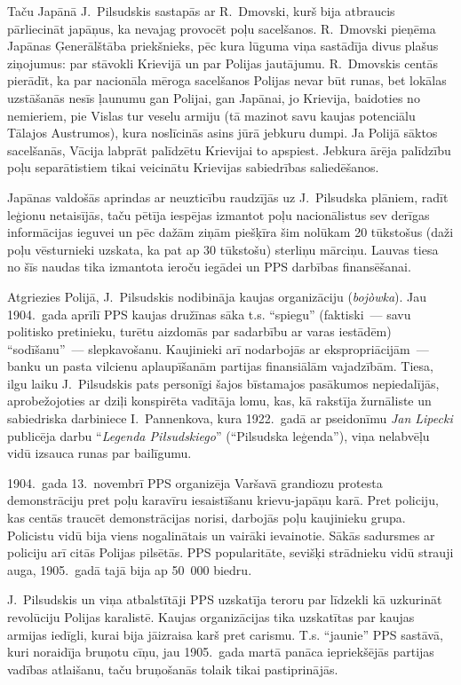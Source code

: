 \documentclass[twoside,a5paper,12pt,fleqn,openany]{extbook}
\newcommand{\pltxti}[1]{\textit{\textpolish{#1}}}
\begin{document}
Taču Japānā J.~Pilsudskis sastapās ar R.~Dmovski, kurš bija atbraucis pārliecināt japāņus, ka nevajag provocēt poļu sacelšanos. R.~Dmovski pieņēma Japānas Ģenerālštāba priekšnieks, pēc kura lūguma viņa sastādīja divus plašus ziņojumus: par stāvokli Krievijā un par Polijas jautājumu. R.~Dmovskis centās pierādīt, ka par nacionāla mēroga sacelšanos Polijas nevar būt runas, bet lokālas uzstāšanās nesīs ļaunumu gan Polijai, gan Japānai, jo Krievija, baidoties no nemieriem, pie Vislas tur veselu armiju (tā mazinot savu kaujas potenciālu Tālajos Austrumos), kura noslīcinās asins jūrā jebkuru dumpi. Ja Polijā sāktos sacelšanās, Vācija labprāt palīdzētu Krievijai to apspiest. Jebkura ārēja palīdzību poļu separātistiem tikai veicinātu Krievijas sabiedrības saliedēšanos.

Japānas valdošās aprindas ar neuzticību raudzījās uz J.~Pilsudska plāniem, radīt leģionu netaisījās, taču pētīja iespējas izmantot poļu nacionālistus sev derīgas informācijas ieguvei un pēc dažām ziņām piešķīra šim nolūkam 20 tūkstošus (daži poļu vēsturnieki uzskata, ka pat ap 30 tūkstošu) sterliņu mārciņu. Lauvas tiesa no šīs naudas tika izmantota ieroču iegādei un PPS darbības finansēšanai.

Atgriezies Polijā, J.~Pilsudskis nodibināja kaujas organizāciju (\pltxti{bojòwka}). Jau 1904.~gada aprīlī PPS kaujas družīnas sāka t.s. ``spiegu'' (faktiski~--- savu politisko pretinieku, turētu aizdomās par sadarbību ar varas iestādēm) ``sodīšanu''~--- slepkavošanu. Kaujinieki arī nodarbojās ar ekspropriācijām~--- banku un pasta vilcienu aplaupīšanām partijas finansiālām vajadzībām. Tiesa, ilgu laiku J.~Pilsudskis pats personīgi šajos bīstamajos pasākumos nepiedalījās, aprobežojoties ar dziļi konspirēta vadītāja lomu, kas, kā rakstīja žurnāliste un sabiedriska darbiniece I.~Pannenkova, kura 1922.~gadā ar pseidonīmu \emph{Jan Lipecki} publicēja darbu ``\pltxti{Legenda Piłsudskiego}'' (``Pilsudska leģenda''), viņa nelabvēļu vidū izsauca runas par bailīgumu.

1904.~gada 13.~novembrī PPS organizēja Varšavā grandiozu protesta demonstrāciju pret poļu karavīru iesaistīšanu krievu-japāņu karā. Pret policiju, kas centās traucēt demonstrācijas norisi, darbojās poļu kaujinieku grupa. Policistu vidū bija viens nogalinātais un vairāki ievainotie. Sākās sadursmes ar policiju arī citās Polijas pilsētās. PPS popularitāte, sevišķi strādnieku vidū strauji auga, 1905.~gadā tajā bija ap 50~000 biedru.

J.~Pilsudskis un viņa atbalstītāji PPS uzskatīja teroru par līdzekli kā uzkurināt revolūciju Polijas karalistē. Kaujas organizācijas tika uzskatītas par kaujas armijas iedīgli, kurai bija jāizraisa karš pret carismu. T.s. ``jaunie'' PPS sastāvā, kuri noraidīja bruņotu cīņu, jau 1905.~gada martā panāca iepriekšējās partijas vadības atlaišanu, taču bruņošanās tolaik tikai pastiprinājās.
\end{document}
